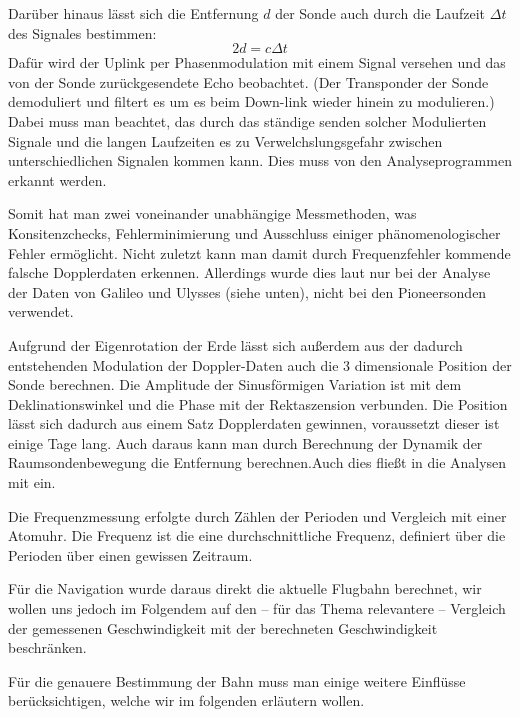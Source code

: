 Darüber hinaus lässt sich die Entfernung $d$ der Sonde auch durch die Laufzeit $\Delta t$ des Signales bestimmen:
\begin{equation}
 2d = c \Delta t
\end{equation}
Dafür wird der Uplink per Phasenmodulation mit einem Signal versehen und das von der Sonde zurückgesendete Echo beobachtet. (Der Transponder der Sonde demoduliert und filtert es um es beim Down-link wieder hinein zu modulieren.)
Dabei muss man beachtet, das durch das ständige senden solcher Modulierten Signale und die langen Laufzeiten es zu Verwelchslungsgefahr zwischen unterschiedlichen Signalen kommen kann. Dies muss von den Analyseprogrammen erkannt werden.

Somit hat man zwei voneinander unabhängige Messmethoden, was Konsitenzchecks,
Fehlerminimierung und Ausschluss einiger phänomenologischer Fehler ermöglicht. Nicht zuletzt kann man damit durch Frequenzfehler kommende falsche Dopplerdaten erkennen.\cite{Anderson2002}
Allerdings wurde dies laut \cite{Anderson2002} nur bei der Analyse der Daten von Galileo und Ulysses (siehe unten), nicht bei den Pioneersonden verwendet.

Aufgrund der Eigenrotation der Erde lässt sich außerdem aus der dadurch entstehenden Modulation der Doppler-Daten auch die 3 dimensionale Position der Sonde berechnen. Die Amplitude der Sinusförmigen Variation ist mit dem Deklinationswinkel und die Phase mit der Rektaszension verbunden. Die Position lässt sich dadurch aus einem Satz Dopplerdaten gewinnen, voraussetzt dieser ist einige Tage lang. Auch daraus kann man durch Berechnung der Dynamik der Raumsondenbewegung die Entfernung berechnen.Auch dies fließt in die Analysen mit ein.\cite{Anderson2002} %

Die Frequenzmessung erfolgte durch Zählen der Perioden und Vergleich mit einer Atomuhr.\cite{Nieto2007} %
Die Frequenz ist die eine durchschnittliche Frequenz, definiert über die Perioden über einen gewissen Zeitraum.

Für die Navigation wurde daraus direkt die aktuelle Flugbahn berechnet, wir wollen uns jedoch im Folgendem auf den – für das Thema relevantere – 
Vergleich der gemessenen Geschwindigkeit mit der berechneten Geschwindigkeit beschränken. %

Für die genauere Bestimmung der Bahn muss man einige weitere Einflüsse berücksichtigen, welche wir im folgenden erläutern wollen.

